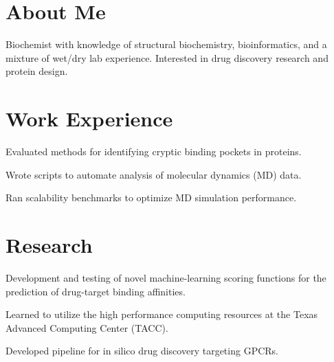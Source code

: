 \documentclass[]{deedy-resume-openfont}
\begin{document}
\hfill
\begin{minipage}[t]{0.66\textwidth} 


\section{About Me}
Biochemist with knowledge of structural biochemistry, bioinformatics, and a mixture of wet/dry lab experience. Interested in drug discovery research and protein design. %
\sectionsep


\section{Work Experience}
\sectionsep
\begin{tightemize}
\item Evaluated methods for identifying cryptic binding pockets in proteins.\item Wrote scripts to automate analysis of molecular dynamics (MD) data. \item Ran scalability benchmarks to optimize MD simulation performance.  \end{tightemize}
\sectionsep


\section{Research}
\begin{tightemize}
\item Development and testing of novel machine-learning scoring functions for the prediction of drug-target binding affinities. \item Learned to utilize the high performance computing resources at the Texas Advanced Computing Center (TACC). \item Developed pipeline for in silico drug discovery targeting GPCRs.%
\end{tightemize}
\sectionsep


\end{minipage}
\end{document}
